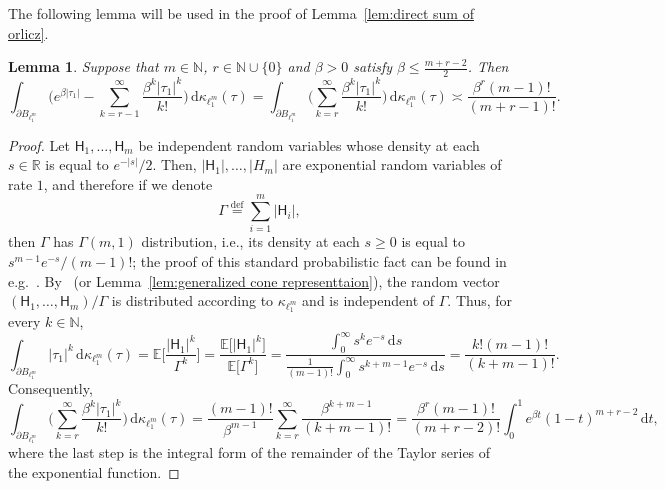 \documentclass[11pt,reqno]{amsart}
\renewcommand{\le}{\leqslant}
\renewcommand{\ge}{\geqslant}
\newcommand{\ud}[0]{\,\mathrm{d}}
\newcommand{\R}{\mathbb R}
\newtheorem{lemma}[theorem]{Lemma}
\theoremstyle{remark}
\newcommand{\E}{\mathbb{ E}}
\newcommand{\N}{\mathbb N}
\newcommand{\eqdef}{\stackrel{\mathrm{def}}{=}}
\renewcommand{\1}{\mathbf 1}
\renewcommand{\H}{\mathsf{H}}
\begin{document}
The following lemma will be used in the proof of Lemma~\ref{lem:direct sum of orlicz}.


\begin{lemma}\label{lem:exponential integrals on l1} Suppose that $m\in \N$, $r\in \N\cup \{0\}$  and $\beta>0$ satisfy  $\beta\le \frac{m+r-2}{2}$. Then
\begin{equation}\label{eq:exponential integrals on l1}
\int_{\partial B_{\ell_1^m}} \bigg(e^{\beta|\tau_1|}-\sum_{k={r-1}}^\infty \frac{\beta^k|\tau_1|^k}{k!}\bigg)\ud\kappa_{\ell_1^m}(\tau)=\int_{\partial B_{\ell_1^m}} \bigg(\sum_{k=r}^\infty \frac{\beta^k|\tau_1|^k}{k!}\bigg)\ud\kappa_{\ell_1^m}(\tau)\asymp \frac{\beta^r(m-1)!}{(m+r-1)!}.
\end{equation}
\end{lemma}

\begin{proof} Let $\H_1,\ldots,\H_m$ be independent random variables whose density at each $s\in \R$ is equal to $e^{-|s|}/2$. Then, $|\H_1|,\ldots,|H_m|$ are exponential random variables of rate $1$, and therefore if we denote $$\Gamma\eqdef \sum_{i=1}^m |\H_i|,$$ then $\Gamma$ has $\Gamma(m,1)$ distribution, i.e., its density at each $s\ge 0$ is equal to $s^{m-1}e^{-s}/(m-1)!$; the proof of this standard probabilistic fact can be found in e.g.~\cite{Dur19}. By~\cite{SZ90,RR91} (or Lemma~\ref{lem:generalized cone representtaion}), the random vector $(\H_1,\ldots,\H_m)/\Gamma$ is distributed according to $\kappa_{\ell_1^m}$ and is independent of $\Gamma$. Thus, for every $k\in \N$,
$$
\int_{\partial B_{\ell_1^m}} |\tau_1|^k \ud\kappa_{\ell_1^m}(\tau) =\E \bigg[\frac{|\H_1|^k}{\Gamma^k}\bigg]=\frac{\E\big[|\H_1|^k\big]}{\E\big[\Gamma^k\big]}=\frac{\int_0^\infty s^ke^{-s}\ud s}{\frac{1}{(m-1)!}\int_0^\infty s^{k+m-1}e^{-s}\ud s}=\frac{k!(m-1)!}{(k+m-1)!}.
$$
Consequently,
\begin{equation}\label{eq:integral form remainder}
\int_{\partial B_{\ell_1^m}} \bigg(\sum_{k=r}^\infty \frac{\beta^k|\tau_1|^k}{k!}\bigg)\ud\kappa_{\ell_1^m}(\tau)=\frac{(m-1)!}{\beta^{m-1}}\sum_{k=r}^\infty\frac{\beta^{k+m-1}}{(k+m-1)!}=
\frac{\beta^r(m-1)!}{(m+r-2)!}\int_0^1 e^{\beta t}(1-t)^{m+r-2}\ud t,
\end{equation}
where the last step is the integral form of the remainder of the Taylor series of the exponential function.


\end{proof}
\end{document}
